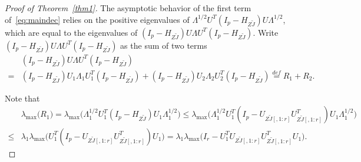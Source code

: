 \documentclass[review]{elsarticle}
\theoremstyle{plain}
\theoremstyle{definition}
\theoremstyle{remark}
\begin{document}
\begin{proof}[\textrm{Proof of Theorem~\ref{thm1}}]
    The asymptotic behavior of the first term of~\eqref{eq:maindec} relies on the positive eigenvalues of $\Lambda^{1/2}U^T (I_p-H_{Z\tilde{J}})U\Lambda^{1/2}$, which are equal to the eigenvalues of $(I_p-H_{Z\tilde{J}})U\Lambda U^T (I_p-H_{Z\tilde{J}})$.
Write $(I_p-H_{Z\tilde{J}})U\Lambda U^T (I_p-H_{Z\tilde{J}})$ as the sum of two terms
$$
\begin{aligned}
&(I_p-H_{Z\tilde{J}})U\Lambda U^T (I_p-H_{Z\tilde{J}})
\\
=&
(I_p-H_{Z\tilde{J}})U_1\Lambda_1 U_1^T(I_p-H_{Z\tilde{J}})+(I_p-H_{Z\tilde{J}})U_2\Lambda_2 U_2^T (I_p-H_{Z\tilde{J}})
\overset{def}{=}R_1+R_2.
\end{aligned}
$$

Note that
$$
\begin{aligned}
&\lambda_{\max}\big( R_1 \big)
=
\lambda_{\max}\big(\Lambda_1^{1/2} U_1^T(I_p-H_{Z\tilde{J}}) U_1 \Lambda_1^{1/2}\big)
\leq 
\lambda_{\max}\big(\Lambda_1^{1/2} U_1^T(I_p-U_{Z\tilde{J}[,1:r]}U_{Z\tilde{J}[,1:r]}^T) U_1 \Lambda_1^{1/2}\big)\\
\leq &
\lambda_1
\lambda_{\max}\big(U_1^T(I_p-U_{Z\tilde{J}[,1:r]}U_{Z\tilde{J}[,1:r]}^T) U_1 \big)
= 
\lambda_1
\lambda_{\max}\big(I_r - U_1^TU_{Z\tilde{J}[,1:r]}U_{Z\tilde{J}[,1:r]}^T U_1 \big).
\end{aligned}
$$


\end{proof}
\end{document}

